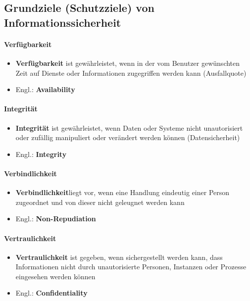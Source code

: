 \documentclass[10pt,a4paper]{article}
\begin{document}
\subsection*{Grundziele (Schutzziele) von Informationssicherheit}
\paragraph*{Verfügbarkeit}
\begin{itemize}[noitemsep,topsep=0pt,leftmargin=*]
    \item \textbf{Verfügbarkeit} ist gewährleistet, wenn in der vom Benutzer gewünschten Zeit auf Dienste oder Informationen zugegriffen werden kann (Ausfallquote)
    \item Engl.: \textbf{Availability}
\end{itemize}

\paragraph*{Integrität}
\begin{itemize}[noitemsep,topsep=0pt,leftmargin=*]
    \item \textbf{Integrität} ist gewährleistet, wenn Daten oder Systeme nicht unautorisiert oder zufällig manipuliert oder verändert werden können (Datensicherheit)
    \item Engl.: \textbf{Integrity}
\end{itemize}

\paragraph*{Verbindlichkeit}
\begin{itemize}[noitemsep,topsep=0pt,leftmargin=*]
    \item \textbf{Verbindlichkeit}liegt vor, wenn eine Handlung eindeutig einer Person zugeordnet und von dieser nicht geleugnet werden kann
    \item Engl.: \textbf{Non-Repudiation}
\end{itemize}

\paragraph*{Vertraulichkeit}
\begin{itemize}[noitemsep,topsep=0pt,leftmargin=*]
    \item \textbf{Vertraulichkeit} ist gegeben, wenn sichergestellt werden kann, dass Informationen nicht durch unautorisierte Personen, Instanzen oder Prozesse eingesehen werden können
    \item Engl.: \textbf{Confidentiality}
\end{itemize}
\end{document}
